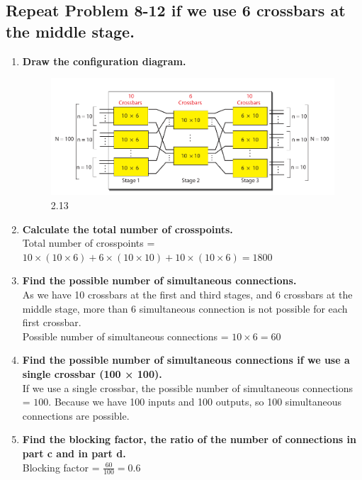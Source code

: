 \documentclass{article}
\begin{document}
\subsection{Repeat Problem 8-12 if we use 6 crossbars at the middle stage.}

\begin{enumerate}
	\item \textbf{ Draw the configuration diagram. } \par
	      \begin{figure}[H]
		      \center
		      \includegraphics[scale=0.5]{8.2.png}
		      \caption{2.13}
	      \end{figure}
	\item \textbf{ Calculate the total number of crosspoints. } \\
	      Total number of crosspoints = $ 10 \times (10 \times 6) + 6 \times (10 \times 10) + 10 \times (10 \times 6) = 1800 $
	\item \textbf{ Find the possible number of simultaneous connections. } \\
	      As we have 10 crossbars at the first and third stages, and 6 crossbars at the middle stage,
	      more than 6 simultaneous connection is not possible for each first crossbar. \\
	      Possible number of simultaneous connections = $ 10 \times 6 = 60 $
	\item \textbf{ Find the possible number of simultaneous connections if we use a single crossbar (100 × 100). } \\
	      If we use a single crossbar, the possible number of simultaneous connections = $ 100 $.
	      Because we have 100 inputs and 100 outputs, so 100 simultaneous connections are possible.
	\item \textbf{ Find the blocking factor, the ratio of the number of connections in part c and in part d. } \\
	      Blocking factor = $ \frac{60}{100} = 0.6 $
\end{enumerate}
\end{document}
